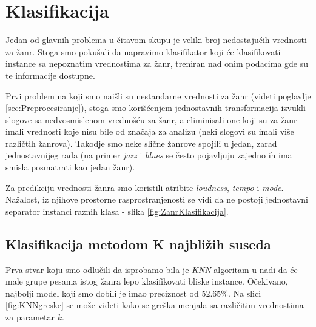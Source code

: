 \section{Klasifikacija}
\label{sec:Klasifikacija}

Jedan od glavnih problema u \v{c}itavom skupu je veliki broj nedostaju\'c{}ih vrednosti za \v{z}anr. Stoga smo poku\v{s}ali da napravimo klasifikator koji \'c{}e klasifikovati instance sa nepoznatim vrednostima za \v{z}anr, treniran nad onim podacima gde su te informacije dostupne.

Prvi problem na koji smo nai\v{s}li su nestandarne vrednosti za \v{z}anr (videti poglavlje \ref{sec:Preprocesiranje}), stoga smo kori\v{s}\'c{}enjem jednostavnih transformacija izvukli slogove sa nedvosmislenom vredno\v{s}\'c{}u za \v{z}anr, a eliminisali one koji su za \v{z}anr imali vrednosti koje nisu bile od zna\v{c}aja za analizu (neki slogovi su imali vi\v{s}e razli\v{c}tih \v{z}anrova). Takodje smo neke sli\v{c}ne \v{z}anrove spojili u jedan, zarad jednostavnijeg rada (na primer \emph{jazz} i \emph{blues} se \v{c}esto pojavljuju zajedno ih ima smisla posmatrati kao jedan \v{z}anr).

Za predikciju vrednosti \v{z}anra smo koristili atribite \emph{loudness}, \emph{tempo} i \emph{mode}. Na\v{z}alost, iz njihove prostorne rasprostranjenosti se vidi da ne postoji jednostavni separator instanci raznih klasa - slika \ref{fig:ZanrKlasifikacija}.

\subsection{Klasifikacija metodom K najbli\v{z}ih suseda}
\label{subsec:knn}

Prva stvar koju smo odlu\v{c}ili da isprobamo bila je \emph{KNN} algoritam u nadi da \'c{}e male grupe pesama istog \v{z}anra lepo klasifikovati bliske instance. O\v{c}ekivano, najbolji model koji smo dobili je imao preciznost od $52.65\%$. Na slici \ref{fig:KNNgreske} se mo\v{z}e videti kako se gre\v{s}ka menjala sa razli\v{c}itim vrednostima za parametar $k$.

